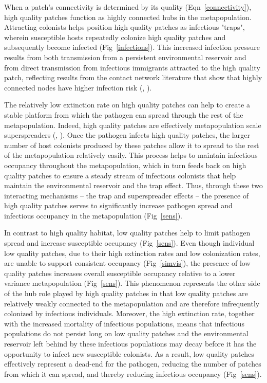 \documentclass{article}
\begin{document}
When a patch's connectivity is determined by its quality (Eqn~\ref{connectivity}), high quality patches function as highly connected hubs in the metapopulation.  Attracting colonists helps position high quality patches as infectious "traps", wherein susceptible hosts repeatedly colonize high quality patches and subsequently become infected (Fig~\ref{infections}).  This increased infection pressure results from both transmission from a persistent environmental reservoir and from direct transmission from infectious immigrants attracted to the high quality patch, reflecting results from the contact network literature that show that highly connected nodes have higher infection risk (\cite{Christley2005}, \cite{Keeling2005}).  

The relatively low extinction rate on high quality patches can help to create a stable platform from which the pathogen can spread through the rest of the metapopulation.  Indeed, high quality patches are effectively metapopulation scale superspreaders (\cite{Lloyd-Smith2005}, \cite{Paull2012}).  Once the pathogen infects high quality patches, the larger number of host colonists produced by these patches allow it to spread to the rest of the metapopulation relatively easily.  This process helps to maintain infectious occupancy throughout the metapopulation, which in turn feeds back on high quality patches to ensure a steady stream of infectious colonists that help maintain the environmental reservoir and the trap effect.  Thus, through these two interacting mechanisms -- the trap and superspreader effects -- the presence of high quality patches serves to significantly increase pathogen spread and infectious occupancy in the metapopulation (Fig~\ref{sens}).  

In contrast to high quality habitat, low quality patches help to limit pathogen spread and increase susceptible occupancy (Fig~\ref{sens}). Even though individual low quality patches, due to their high extinction rates and low colonization rates, are unable to support consistent occupancy (Fig~\ref{simvis}), the presence of low quality patches increases overall susceptible occupancy relative to a lower variance metapopulation (Fig~\ref{sens}).  This phenomenon represents the other side of the hub role played by high quality patches in that low quality patches are relatively weakly connected to the metapopulation and are therefore infrequently colonized by infectious individuals.  Moreover, the high extinction rate, together with the increased mortality of infectious populations, means that infectious populations do not persist long on low quality patches and the environmental reservoir left behind by these infectious populations may decay before it has the opportunity to infect new susceptible colonists.  As a result, low quality patches effectively represent a dead-end for the pathogen, reducing the number of patches from which it can spread, and thereby reducing infectious occupancy (Fig~\ref{sens}). 
\end{document}
